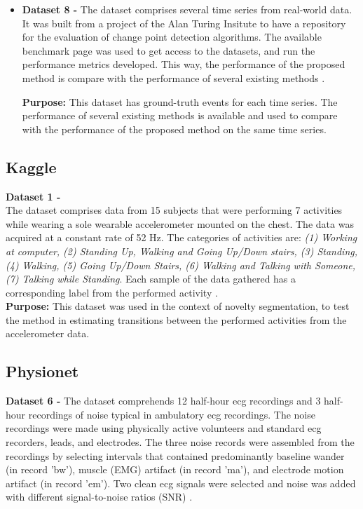 \begin{itemize}
    
    \item \textbf{Dataset 8 - } The dataset comprises several time series from real-world data. It was built from a project of the Alan Turing Insitute to have a repository for the evaluation of change point detection algorithms. The available benchmark page was used to get access to the datasets, and run the performance metrics developed. This way, the performance of the proposed method is compare with the performance of several existing methods \cite{cpd_alan}.
    \par
    \textbf{Purpose:} This dataset has ground-truth events for each time series. The performance of several existing methods is available and used to compare with the performance of the proposed method on the same time series.

\end{itemize}
    
\subsection{Kaggle}

\textbf{Dataset 1 - }\\
The dataset comprises data from 15 subjects that were performing 7 activities while wearing a sole wearable accelerometer mounted on the chest. The data was acquired at a constant rate of 52 Hz. The categories of activities are: \textit{(1) Working at computer, (2) Standing Up, Walking and Going Up/Down stairs, (3) Standing, (4) Walking, (5) Going Up/Down Stairs, (6) Walking and Talking with Someone, (7) Talking while Standing}. Each sample of the data gathered has a corresponding label from the performed activity \cite{dataset1}.\\

\textbf{Purpose:} This dataset was used in the context of novelty segmentation, to test the method in estimating transitions between the performed activities from the accelerometer data.

\subsection{Physionet}

\textbf{Dataset 6 - } The dataset comprehends 12 half-hour \gls{ecg} recordings and 3 half-hour recordings of noise typical in ambulatory \gls{ecg} recordings. The noise recordings were made using physically active volunteers and standard \gls{ecg} recorders, leads, and electrodes. The three noise records were assembled from the recordings by selecting intervals that contained predominantly baseline wander (in record 'bw'), muscle (EMG) artifact (in record 'ma'), and electrode motion artifact (in record 'em'). Two clean \gls{ecg} signals were selected and noise was added with different signal-to-noise ratios (SNR) \cite{dataset6, PhysioNet}.\\

